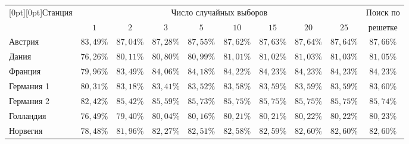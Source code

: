 \begin{multicols}{2}
\begin{table*}
\begin{center}
\tabcolsep=7.8pt
\begin{tabular}{|l|c|c|c|c|c|c|c|c|c|}
\hline
\multicolumn{1}{|c|}{\raisebox{-6pt}[0pt][0pt]{Станция}}&
\multicolumn{8}{c|}{Число случайных выборов}&{Поиск по} \\
\cline{2-9}
&$1$&$2$&$3$&$5$&$10$&$15$&$20$&$25$&{решетке}\\
\hline
Австрия&$83{,}49\%$ &$87{,}04\%$    &$87{,}28\%$    &$87{,}55\%$    &$87{,}62\%$     &$87{,}63\%$   &$87{,}64\%$    &$87{,}64\%$    &$87{,}66\%$\\
Дания&$76{,}26\%$   &$80{,}11\%$&   $80{,}80\%$ &$80{,}99\%$    &$81{,}01\%$     &$81{,}02\%$   &$81{,}03\%$    &$81{,}03\%$    &$81{,}05\%$\\
Франция&$79{,}96\%$ &$83{,}49\%$    &$84{,}06\%$    &$84{,}18\%$    &$84{,}22\%$     &$84{,}23\%$   &$84{,}23\%$    &$84{,}23\%$    &$84{,}23\%$\\
Германия 1&$80{,}31\%$  &$83{,}18\%$    &$83{,}41\%$        &$83{,}52\%$    &$83{,}58\%$     &$83{,}59\%$   &$83{,}59\%$    &$83{,}59\%$    &$83{,}60\%$\\
Германия 2&$82{,}42\%$  &$85{,}42\%$&   $85{,}59\%$ &$85{,}73\%$    &$85{,}75\%$     &$85{,}75\%$   &$85{,}75\%$    &$85{,}75\%$    &$85{,}74\%$\\
Голландия&$76{,}49\%$   &$79{,}40\%$    &$80{,}04\%$    &$80{,}16\%$    &$80{,}21\%$     &$80{,}21\%$   &$80{,}22\%$    &$80{,}22\%$    &$80{,}23\%$\\
Норвегия&$78{,}48\%$    &$81{,}96\%$    &$82{,}27\%$        &$82{,}51\%$    &$82{,}58\%$     &$82{,}59\%$   &$82{,}60\%$    &$82{,}60\%$    &$82{,}60\%$\\
\hline
\end{tabular}
\end{center}
\begin{center}
\label{Tab2}
\vspace*{2ex}


\end{center}
\end{table*}
\end{multicols}
